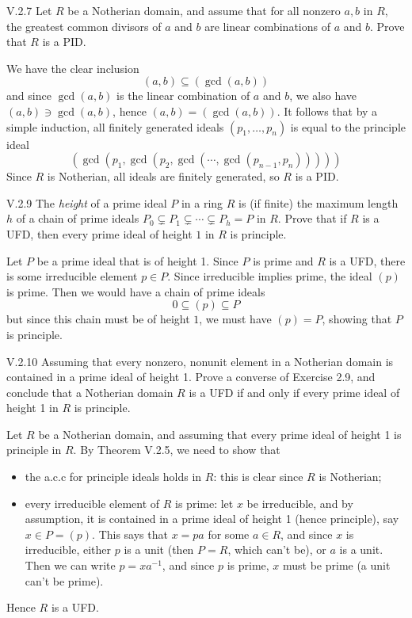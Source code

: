 \begin{problem}{V.2.7}
Let $R$ be a Notherian domain, and assume that for all nonzero $a,b$ in $R$, the greatest common divisors of $a$ and $b$ are linear combinations of $a$ and $b$. Prove that $R$ is a PID.
\end{problem}
\begin{pf}
We have the clear inclusion
\[
(a,b) \subseteq (\gcd(a,b))	
\]
and since $\gcd(a,b)$ is the linear combination of $a$ and $b$, we also have $(a,b) \ni \gcd(a,b)$, hence $(a,b) = (\gcd(a,b))$. It follows that by a simple induction, all finitely generated ideals $(p_1,\dotsc,p_n)$ is equal to the principle ideal
\[
(\gcd(p_1, \gcd(p_2, \gcd(\cdots,\gcd(p_{n-1}, p_n)))))
\]
Since $R$ is Notherian, all ideals are finitely generated, so $R$ is a PID.
\end{pf}

\begin{problem}{V.2.9}
The \emph{height} of a prime ideal $P$ in a ring $R$ is (if finite) the maximum length $h$ of a chain of prime ideals $P_0 \subsetneq P_1 \subsetneq \cdots \subsetneq P_h = P$ in $R$. Prove that if $R$ is a UFD, then every prime ideal of height $1$ in $R$ is principle.
\end{problem}
\begin{pf}
Let $P$ be a prime ideal that is of height 1. Since $P$ is prime and $R$ is a UFD, there is some irreducible element $p \in P$. Since irreducible implies prime, the ideal $(p)$ is prime. Then we would have a chain of prime ideals 
\[
0 \subseteq (p) \subseteq P
\]
but since this chain must be of height $1$, we must have $(p) = P$, showing that $P$ is principle.
\end{pf}

\begin{problem}{V.2.10}
Assuming that every nonzero, nonunit element in a Notherian domain is contained in a prime ideal of height 1. Prove a converse of Exercise 2.9, and conclude that a Notherian domain $R$ is a UFD if and only if every prime ideal of height 1 in $R$ is principle.
\end{problem}
\begin{pf}
Let $R$ be a Notherian domain, and assuming that every prime ideal of height 1 is principle in $R$. By Theorem V.2.5, we need to show that
\begin{itemize}
	\setlength\itemsep{0pt}
	\item the a.c.c for principle ideals holds in $R$: this is clear since $R$ is Notherian;
	\item every irreducible element of $R$ is prime: let $x$ be irreducible, and by assumption, it is contained in a prime ideal of height 1 (hence principle), say $x \in P = (p)$. This says that $x = pa$ for some $a \in R$, and since $x$ is irreducible, either $p$ is a unit (then $P=R$, which can't be), or $a$ is a unit. Then we can write $p = xa^{-1}$, and since $p$ is prime, $x$ must be prime (a unit can't be prime).
\end{itemize}
Hence $R$ is a UFD.
\end{pf}

